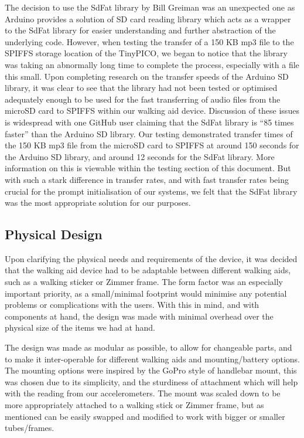                     The decision to use the SdFat library by Bill Greiman \cite{greiman} was an unexpected one as Arduino provides a solution of SD card reading library \cite{arduino} which acts as a wrapper to the SdFat library for easier understanding and further abstraction of the underlying code. However, when testing the transfer of a 150 KB mp3 file to the SPIFFS storage location of the TinyPICO, we began to notice that the library was taking an abnormally long time to complete the process, especially with a file this small. Upon completing research on the transfer speeds of the Arduino SD library, it was clear to see that the library had not been tested or optimised adequately enough to be used for the fast transferring of audio files from the microSD card to SPIFFS within our walking aid device. Discussion of these issues is widespread \cite{fat16lib_2011,drdooom_2019} with one GitHub user claiming that the SdFat library is ``85 times faster'' \cite{kas2_2018} than the Arduino SD library. Our testing demonstrated transfer times of the 150 KB mp3 file from the microSD card to SPIFFS at around 150 seconds for the Arduino SD library, and around 12 seconds for the SdFat library. More information on this is viewable within the testing section of this document. But with such a stark difference in transfer rates, and with fast transfer rates being crucial for the prompt initialisation of our systems, we felt that the SdFat library was the most appropriate solution for our purposes.
        
                \subsection{Physical Design}
                \label{subsec:Design_Decisions_walking_aid}
        
                    Upon clarifying the physical needs and requirements of the device, it was decided that the walking aid device had to be adaptable between different walking aids, such as a walking sticker or Zimmer frame. The form factor was an especially important priority, as a small/minimal footprint would minimise any potential problems or complications with the users. With this in mind, and with components at hand, the design was made with minimal overhead over the physical size of the items we had at hand. 
        
                    
        
                    The design was made as modular as possible, to allow for changeable parts, and to make it inter-operable for different walking aids and mounting/battery options. The mounting options were inspired by the GoPro style of handlebar mount, this was chosen due to its simplicity, and the sturdiness of attachment which will help with the reading from our accelerometers. The mount was scaled down to be more appropriately attached to a walking stick or Zimmer frame, but as mentioned can be easily swapped and modified to work with bigger or smaller tubes/frames.
        
